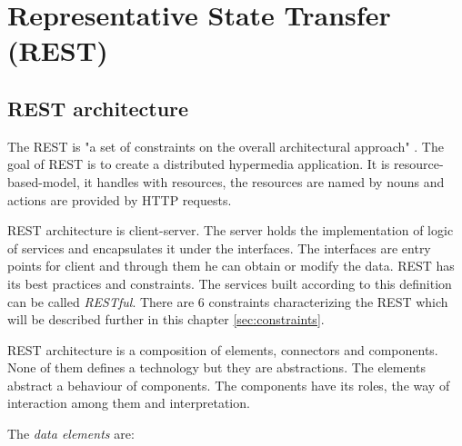 \chapter{Representative State Transfer (REST)}
\label{chap:rest}

\section{REST architecture}
\label{sec:rest-architecture}

The REST is "a set of constraints on the overall architectural approach" \cite{agile-architecture}. The goal of REST is to create a distributed hypermedia application. It is \gls{resource-based-model}, it handles with resources, the resources are named by nouns and actions are provided by HTTP requests. 

REST architecture is client-server. The server holds the implementation of logic of services and encapsulates it under the interfaces. The interfaces are entry points for client and through them he can obtain or modify the data.
REST has its best practices and constraints. The services built according to this definition can be called \emph{RESTful}. There are 6 constraints characterizing the REST which will be described further in this chapter \ref{sec:constraints}.

REST architecture is a composition of elements, connectors and components. None of them defines a technology but they are abstractions. The elements abstract a behaviour of components. The components have its roles, the way of interaction among them and interpretation.

The \emph{data elements} are:

